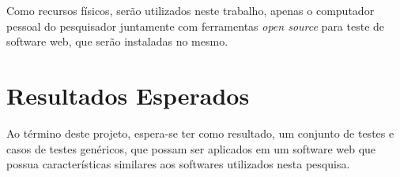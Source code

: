 \documentclass[12pt]{article}
\begin{document}
	Como recursos físicos, serão utilizados neste trabalho, apenas o computador pessoal do pesquisador juntamente
	com ferramentas \emph{open source} para teste de software web, que serão instaladas no mesmo.
	
	\section{Resultados Esperados}
	
	Ao término deste projeto, espera-se ter como resultado, um conjunto de testes e casos de testes genéricos,
	que possam ser aplicados em um software web que possua características similares aos softwares utilizados
	nesta pesquisa.
	
	
	
	
\end{document}

